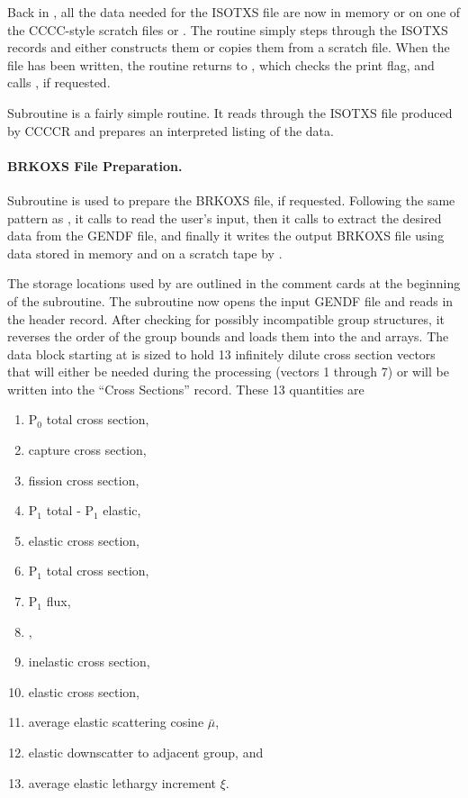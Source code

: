 Back in , all the data needed for the ISOTXS file are now
in memory or on one of the CCCC-style scratch files  or
.  The routine simply steps through the ISOTXS records
and either constructs them or copies them from a scratch file.  When
the file has been written, the routine returns to , which
checks the print flag, and calls , if requested.

Subroutine  is a fairly
simple routine.  It reads through the ISOTXS file produced by CCCCR
and prepares an interpreted listing of the data.

\paragraph{BRKOXS File Preparation.}
Subroutine  is used to
prepare the BRKOXS file, if requested.  Following the same pattern
as , it calls 
to read the user's input, then it calls  to extract
the desired data from the GENDF file, and finally it writes
the output BRKOXS file using data stored in memory and on a scratch
tape by .

The storage locations used by 
are outlined in the comment cards at the beginning of the subroutine.
The subroutine now opens the input GENDF file and reads in the header
record.  After checking for possibly incompatible group structures, it
reverses the order of the group bounds and loads them into the 
and  arrays.  The data block starting at  is
sized to hold 13 infinitely dilute cross section vectors that will
either be needed during the processing (vectors 1 through 7) or
will be written into the ``Cross Sections'' record.  These
13 quantities are

\begin{singlespace}
\begin{enumerate}

\item P$_0$ total cross section,
\item capture cross section,
\item fission cross section,
\item P$_1$ total - P$_1$ elastic,
\item elastic cross section,
\item P$_1$ total cross section,
\item P$_1$ flux,
\item {},
\item inelastic cross section,
\item elastic cross section,
\item average elastic scattering cosine $\bar{\mu}$,
\item elastic downscatter to adjacent group, and
\item average elastic lethargy increment $\xi$.

\end{enumerate}
\end{singlespace}

